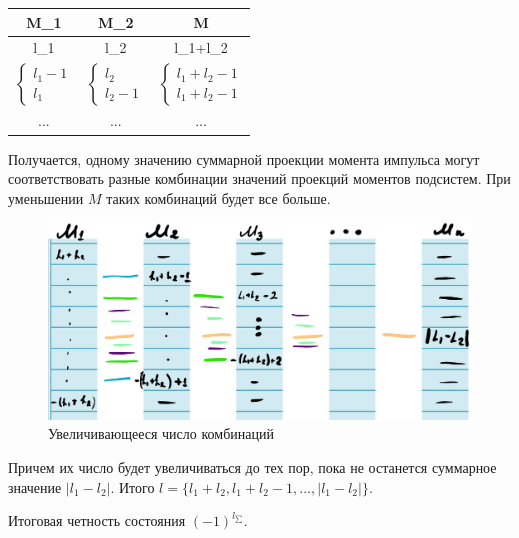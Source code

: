 \begin{table}[h]
\centering
\begin{tabular}[c]{|c|c|c|}
\hline 
M_1 & M_2 & M \\ \hline 
l_1 & l_2 & l_1+l_2\\
\begin{equation*}
 \begin{cases}
    l_1-1
\\
    l_1 
 \end{cases}
\end{equation*} & \begin{equation*}
 \begin{cases}
    l_2
\\
    l_2-1 
 \end{cases}
\end{equation*}&\begin{equation*}
 \begin{cases}
    l_1+l_2-1
\\
     l_1+l_2-1
 \end{cases}
\end{equation*}\\
...& ...& ...\\
\hline
\end{tabular}
\end{table}
\par Получается, одному значению суммарной проекции момента импульса могут соответствовать разные комбинации значений проекций моментов подсистем. При уменьшении $M$ таких комбинаций будет все больше.

\par 
\begin{figure} 
\vspace{-2ex}
\includegraphics[width=1\linewidth]{pictures/18.1.jpg}
\caption{Увеличивающееся число комбинаций}
\end{figure}
\par Причем их число будет увеличиваться до тех пор, пока не останется суммарное значение $|l_1-l_2|$. Итого $l = \{ l_1+l_2,l_1+l_2-1, ..., |l_1-l_2|  \}$.
\par Итоговая четность состояния $(-1)^{l_{\sum}}$.